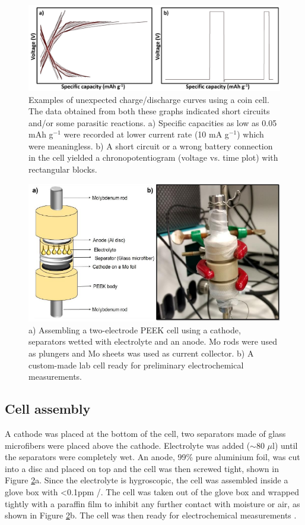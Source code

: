 \begin{figure}[tbh!]
\centering
\includegraphics[width=\textwidth]{Figures/chap3fig/weirdcdc.pdf}
\caption{Examples of unexpected charge/discharge curves using a coin cell. The data obtained from both these graphs indicated short circuits and/or some parasitic reactions. a) Specific capacities as low as 0.05 mAh g$^{-1}$ were recorded at lower current rate (10 mA g$^{-1}$) which were meaningless. b) A short circuit or a wrong battery connection in the cell yielded a chronopotentiogram (voltage vs. time plot) with rectangular blocks.}
\label{Figures/chap3fig:weirdcdc}
\end{figure}

\begin{figure}[tbh!]
\centering
\includegraphics[width=\textwidth]{Figures/chap3fig/swagelok.pdf}
\caption{a) Assembling a two-electrode PEEK cell using a cathode, separators wetted with electrolyte and an anode. Mo rods were used as plungers and Mo sheets was used as current collector. b) A custom-made lab cell ready for preliminary electrochemical measurements.}
\label{Figures/chap3fig:swagelok}
\end{figure}

\subsection*{Cell assembly}
A cathode was placed at the bottom of the cell, two separators made of glass microfibers were placed above the cathode. Electrolyte was added ($\sim$80 $\mu$l) until the separators were completely wet. An anode, 99\% pure aluminium foil, was cut into a disc and placed on top and the cell was then screwed tight, shown in Figure \ref{Figures/chap3fig:swagelok}a. Since the electrolyte is hygroscopic, the cell was assembled inside a glove box with <0.1ppm /. The cell was taken out of the glove box and wrapped tightly with a paraffin film to inhibit any further contact with moisture or air, as shown in Figure \ref{Figures/chap3fig:swagelok}b. The cell was then ready for electrochemical measurements . 

